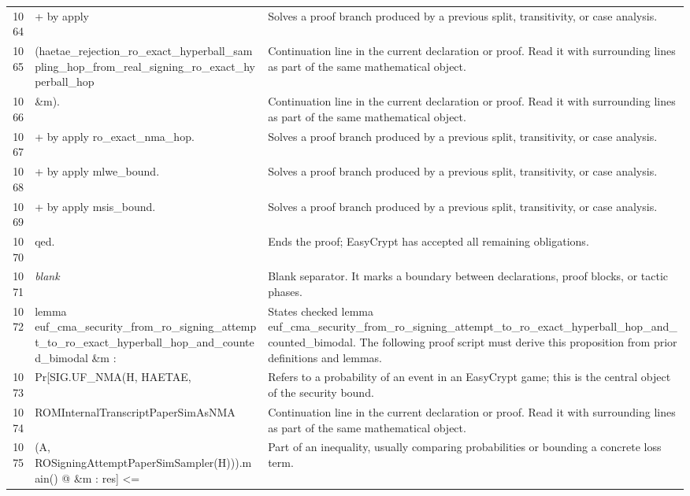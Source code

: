 \documentclass[10pt]{article}
\begin{document}
\begin{longtable}{r L{0.53\textwidth} L{0.37\textwidth}}
1064 & {\ttfamily\scriptsize   + by apply} & Solves a proof branch produced by a previous split, transitivity, or case analysis. \\
1065 & {\ttfamily\scriptsize       (haetae\_rejection\_ro\_exact\_hyperball\_sampling\_hop\_from\_real\_signing\_ro\_exact\_hyperball\_hop} & Continuation line in the current declaration or proof.  Read it with surrounding lines as part of the same mathematical object. \\
1066 & {\ttfamily\scriptsize          \&m).} & Continuation line in the current declaration or proof.  Read it with surrounding lines as part of the same mathematical object. \\
1067 & {\ttfamily\scriptsize   + by apply ro\_exact\_nma\_hop.} & Solves a proof branch produced by a previous split, transitivity, or case analysis. \\
1068 & {\ttfamily\scriptsize + by apply mlwe\_bound.} & Solves a proof branch produced by a previous split, transitivity, or case analysis. \\
1069 & {\ttfamily\scriptsize + by apply msis\_bound.} & Solves a proof branch produced by a previous split, transitivity, or case analysis. \\
1070 & {\ttfamily\scriptsize qed.} & Ends the proof; EasyCrypt has accepted all remaining obligations. \\
1071 & {\ttfamily\scriptsize \emph{blank}} & Blank separator.  It marks a boundary between declarations, proof blocks, or tactic phases. \\
1072 & {\ttfamily\scriptsize lemma euf\_cma\_security\_from\_ro\_signing\_attempt\_to\_ro\_exact\_hyperball\_hop\_and\_counted\_bimodal \&m :} & States checked lemma euf\_cma\_security\_from\_ro\_signing\_attempt\_to\_ro\_exact\_hyperball\_hop\_and\_counted\_bimodal.  The following proof script must derive this proposition from prior definitions and lemmas. \\
1073 & {\ttfamily\scriptsize   Pr[SIG.UF\_NMA(H, HAETAE,} & Refers to a probability of an event in an EasyCrypt game; this is the central object of the security bound. \\
1074 & {\ttfamily\scriptsize        ROMInternalTranscriptPaperSimAsNMA} & Continuation line in the current declaration or proof.  Read it with surrounding lines as part of the same mathematical object. \\
1075 & {\ttfamily\scriptsize          (A, ROSigningAttemptPaperSimSampler(H))).main() @ \&m : res] <=} & Part of an inequality, usually comparing probabilities or bounding a concrete loss term. \\

\end{longtable}
\end{document}
